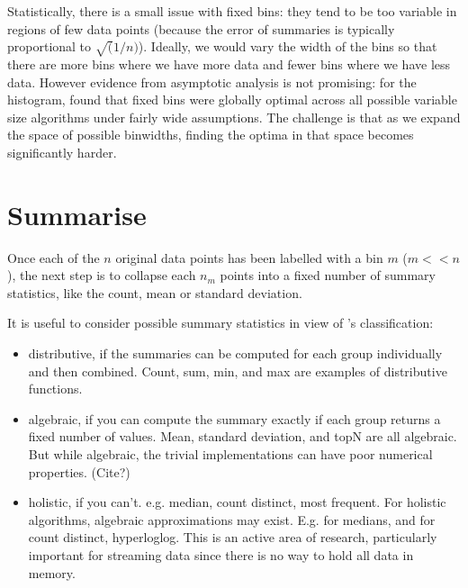 \documentclass[journal]{vgtc}                %
\begin{document}
Statistically, there is a small issue with fixed bins: they tend to be too variable in regions of few data points (because the error of summaries is typically proportional to $\sqrt(1/n)$). Ideally, we would vary the width of the bins so that there are more bins where we have more data and fewer bins where we have less data. However evidence from asymptotic analysis is not promising: for the histogram, \cite{kogure:1987} found that fixed bins were globally optimal across all possible variable size algorithms under fairly wide assumptions. The challenge is that as we expand the space of possible binwidths, finding the optima in that space becomes significantly harder. 



\section{Summarise}
\label{sec:summarise}

Once each of the $n$ original data points has been labelled with a bin $m$ ($m << n$), the next step is to collapse each $n_m$ points into a fixed number of summary statistics, like the count, mean or standard deviation.

It is useful to consider possible summary statistics in view of \citep{gray:1997}'s classification:

\begin{itemize}
  \item distributive, if the summaries can be computed for each group individually and then combined. Count, sum, min, and max are examples of distributive functions.
  
  \item algebraic, if you can compute the summary exactly if each group returns a fixed number of values. Mean, standard deviation, and topN are all algebraic. But while algebraic, the trivial implementations can have poor numerical properties. (Cite?)
  
  \item holistic, if you can't. e.g. median, count distinct, most frequent. For holistic algorithms, algebraic approximations may exist. E.g. for medians, and for count distinct, hyperloglog.  This is an active area of research, particularly important for streaming data since there is no way to hold all data in memory.

\end{itemize}
\end{document}
